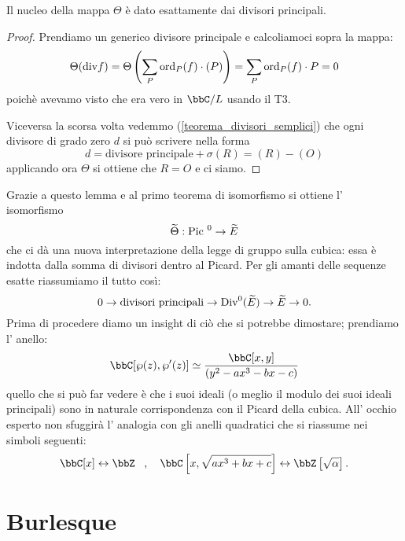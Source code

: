 
\begin{lemma}
Il nucleo della mappa $\Theta$ è dato esattamente dai divisori principali.
\end{lemma}
\begin{proof}
Prendiamo un generico divisore principale e calcoliamoci sopra la mappa:
$$
\Theta(\mbox{div} f)=\Theta\left(\sum_P \text{ord}_P(f) \cdot (P)\right)=\sum_P \text{ord}_P(f)\cdot P=0
$$
poichè avevamo visto che era vero in $\bbC/L$ usando il T3.

Viceversa la scorsa volta vedemmo (\ref{teorema_divisori_semplici}) che ogni divisore di grado zero $d$ si può scrivere nella forma
$$ d = \mbox{divisore principale} + \sigma(R) = (R) - (O) $$
applicando ora $\Theta$ si ottiene che $R=O$ e ci siamo.
\end{proof}


Grazie a questo lemma e al primo teorema di isomorfismo si ottiene l' isomorfismo
$$
\widetilde{\Theta}: \mbox{Pic }^0 \rightarrow \widetilde{E}
$$
che ci dà una nuova interpretazione della legge di gruppo sulla cubica: essa è indotta dalla somma di divisori dentro al Picard. Per gli amanti delle sequenze esatte riassumiamo il tutto così:
$$
0\rightarrow\mbox{divisori principali}\rightarrow \mbox{Div}^0(\widetilde{E})\rightarrow \widetilde{E}\rightarrow 0.
$$
Prima di procedere diamo un insight di ciò che si potrebbe dimostare; prendiamo l' anello:
$$
\bbC[\wp(z),\wp'(z)]\simeq\frac{\bbC[x,y]}{(y^2 - ax^3 - bx - c)}
$$
quello che si può far vedere è che i suoi ideali (o meglio il modulo dei suoi ideali principali) sono in naturale corrispondenza con il Picard della cubica. All' occhio esperto non sfuggirà l' analogia con gli anelli quadratici che si riassume nei simboli seguenti:
$$
\bbC[x] \leftrightarrow \bbZ\, \ \ , \ \ \ \bbC\left[x,\sqrt{ax^3+bx+c}\right] \leftrightarrow \bbZ\left[\sqrt{\alpha}\right].
$$

\chapter{Burlesque}

